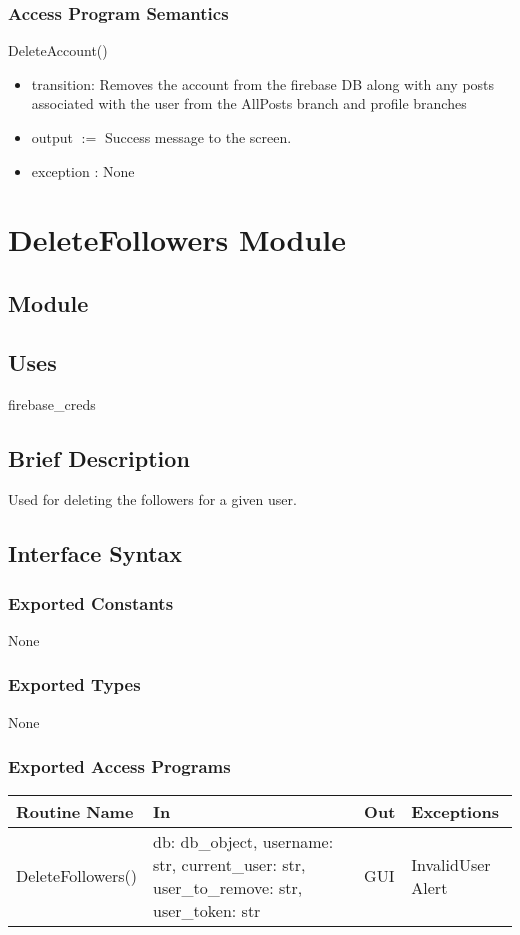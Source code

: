 \documentclass[12pt, titlepage]{article}
\begin{document}
\subsubsection{Access Program Semantics}
DeleteAccount()
\begin{itemize}
    \item transition: Removes the account from the firebase DB along with any posts associated with the user from the AllPosts branch and profile branches
    \item output $:= $ Success message to the screen.
    \item exception : None
\end{itemize}






\newpage
\section* {DeleteFollowers Module}

\subsection*{Module}

\subsection* {Uses}
firebase\_creds

\subsection* {Brief Description}
Used for deleting the followers for a given user.

\subsection* {Interface Syntax}
\subsubsection* {Exported Constants}
None

\subsubsection* {Exported Types}
None

\subsubsection* {Exported Access Programs}
\begin{table}[!htb]
    \centering
    \begin{tabular}{|p{3cm}|p{3cm}|p{3cm}|p{4.5cm}|}
        \hline
        \textbf{Routine Name} & \textbf{In} & \textbf{Out} & \textbf{Exceptions} \\
        \hline
         DeleteFollowers() & db: db\_object, username: str, current\_user: str, user\_to\_remove: str, user\_token: str  & GUI & InvalidUser Alert\\
        \hline
    \end{tabular}
\end{table}
\end{document}

